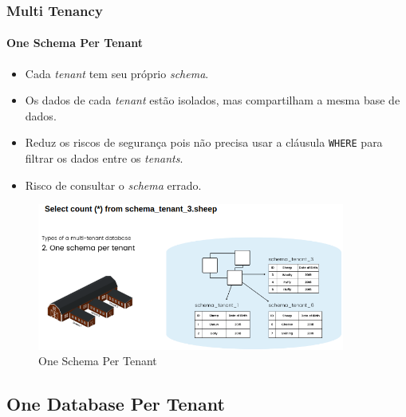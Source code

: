\documentclass[
	9pt, %
	t, %
]{beamer}
\begin{document}
\begin{frame}
	\frametitle{Multi Tenancy}
	\framesubtitle{One Schema Per Tenant}

	\begin{itemize}
		\item Cada \textit{tenant} tem seu próprio \textit{schema}.
		\item Os dados de cada \textit{tenant} estão isolados, mas compartilham a mesma base de dados.
		\item Reduz os riscos de segurança pois não precisa usar a cláusula \texttt{WHERE} para filtrar os dados entre os \textit{tenants}.
		\item \alert{Risco de consultar o \textit{schema} errado.}
	\end{itemize}

	\begin{figure}
		\centering
		\includegraphics[width=0.9\textwidth]{one_schema.png}
		\caption{One Schema Per Tenant}
	\end{figure}

\end{frame}

\subsection{One Database Per Tenant}
\end{document}
